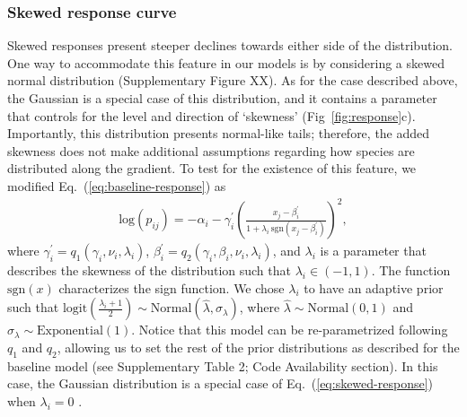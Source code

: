 \documentclass[11pt, a4paper]{article}
\begin{document}
\subsubsection*{Skewed response curve}
Skewed responses present steeper declines towards either side of the distribution. One way to accommodate this feature in our models is by considering a skewed normal distribution (Supplementary Figure XX). As for the case described above, the Gaussian is a special case of this distribution, and it contains a parameter that controls for the level and direction of `skewness' (Fig~\ref{fig:response}c). Importantly, this distribution presents normal-like tails; therefore, the added skewness does not make additional assumptions regarding how species are distributed along the gradient. To test for the existence of this feature, we modified Eq.~(\ref{eq:baseline-response}) as
\begin{equation}	
\begin{split}
\text{log}\left(p_{ij}\right) = -\alpha_{i} - \gamma^{\prime}_{i}\left(\frac{x_{j}-\beta^{\prime}_{i}}{1+\lambda_{i}\,\text{sgn}\left(x_{j}-\beta^{\prime}_{i}\right)}\right)^{2} ,
\end{split}
\label{eq:skewed-response}
\end{equation}
where $\gamma^{\prime}_{i} = q_{1}\left(\gamma_{i}, \nu_{i}, \lambda_{i}\right)$, $\beta^{\prime}_{i} = q_{2}\left(\gamma_{i}, \beta_{i}, \nu_{i}, \lambda_{i}\right)$, and $\lambda_{i}$ is a parameter that describes the skewness of the distribution such that $\lambda_{i}\in\left(-1, 1\right)$. The function $\text{sgn}\left(x\right)$ characterizes the sign function.  We chose $\lambda_i$ to have an adaptive prior such that $\text{logit}\left(\frac{\lambda_{i}+1}{2}\right)\sim \text{Normal}\left(\hat{\lambda}, \sigma_{\lambda}\right)$, where $\hat{\lambda}\sim\text{Normal}\left(0, 1\right)$ and $\sigma_{\lambda}\sim\text{Exponential}\left(1\right)$. Notice that this model can be re-parametrized following $q_1$ and $q_2$, allowing us to set the rest of the prior distributions as described for the baseline model (see Supplementary Table 2; Code Availability section). In this case, the Gaussian distribution is a special case of Eq.~(\ref{eq:skewed-response}) when $\lambda_{i}=0$ \citep{ashourApproximateSkewNormal2010}.
\end{document}
